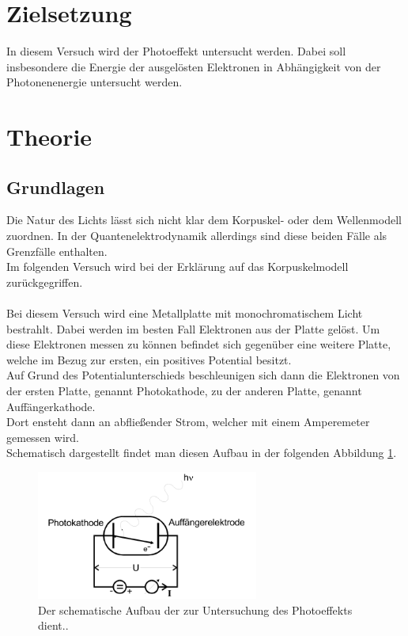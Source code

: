 \section{Zielsetzung}
    \noindent In diesem Versuch wird der Photoeffekt untersucht werden. 
    Dabei soll insbesondere die Energie der ausgelösten Elektronen in Abhängigkeit von der Photonenenergie untersucht werden.\\



\section{Theorie}

    \subsection{Grundlagen}

        \noindent  Die Natur des Lichts lässt sich nicht klar dem Korpuskel- oder dem Wellenmodell zuordnen. 
        In der Quantenelektrodynamik allerdings sind diese beiden Fälle als Grenzfälle enthalten.\\
        Im folgenden Versuch wird bei der Erklärung auf das Korpuskelmodell zurückgegriffen.\\\\

        \noindent Bei diesem Versuch wird eine Metallplatte mit monochromatischem Licht bestrahlt. Dabei werden im besten Fall Elektronen aus der Platte gelöst.
        Um diese Elektronen messen zu können befindet sich gegenüber eine weitere Platte, welche im Bezug zur ersten, ein positives Potential besitzt.\\
        Auf Grund des Potentialunterschieds beschleunigen sich dann die Elektronen von der ersten Platte, genannt Photokathode, zu der anderen Platte, genannt Auffängerkathode.\\
        Dort ensteht dann an abfließender Strom, welcher mit einem Amperemeter gemessen wird.\\

        \noindent Schematisch dargestellt findet man diesen Aufbau in der folgenden Abbildung \ref{img:schem}. 

        \begin{figure}[H]
            \centering
            \includegraphics[width=0.65\textwidth]{latex/images/Schaltkreis.PNG}
            \caption{Der schematische Aufbau der zur Untersuchung des Photoeffekts dient.\protect \cite{500}.}
            \label{img:schem}
        \end{figure}

